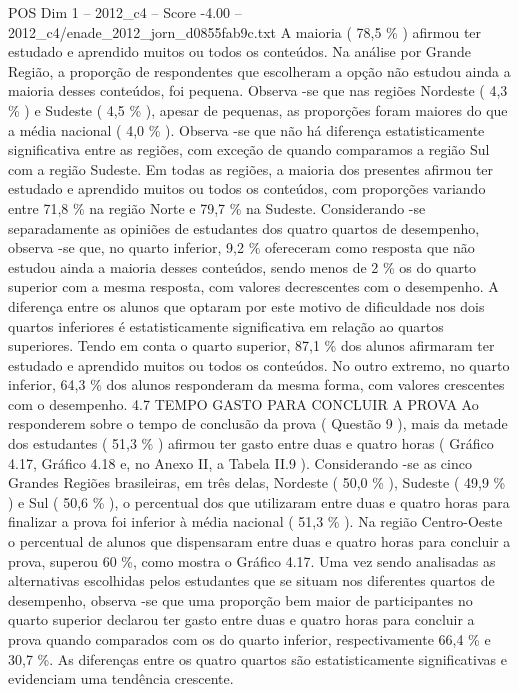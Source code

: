 \begin{textsample}{POS Dim 1 – 2012\_c4 – Score -4.00 – 2012\_c4/enade\_2012\_jorn\_d0855fab9c.txt}
A maioria ( 78,5 \% ) afirmou ter estudado e aprendido muitos ou todos os conteúdos.
Na análise por Grande Região, a proporção de respondentes que escolheram a opção não estudou ainda a maioria desses conteúdos, foi pequena.
Observa -se que nas regiões Nordeste ( 4,3 \% ) e Sudeste ( 4,5 \% ), apesar de pequenas, as proporções foram maiores do que a média nacional ( 4,0 \% ).
Observa -se que não há diferença estatisticamente significativa entre as regiões, com exceção de quando comparamos a região Sul com a região Sudeste.
Em todas as regiões, a maioria dos presentes afirmou ter estudado e aprendido muitos ou todos os conteúdos, com proporções variando entre 71,8 \% na região Norte e 79,7 \% na Sudeste.
Considerando -se separadamente as opiniões de estudantes dos quatro quartos de desempenho, observa -se que, no quarto inferior, 9,2 \% ofereceram como resposta que não estudou ainda a maioria desses conteúdos, sendo menos de 2 \% os do quarto superior com a mesma resposta, com valores decrescentes com o desempenho.
A diferença entre os alunos que optaram por este motivo de dificuldade nos dois quartos inferiores é estatisticamente significativa em relação ao quartos superiores.
Tendo em conta o quarto superior, 87,1 \% dos alunos afirmaram ter estudado e aprendido muitos ou todos os conteúdos.
No outro extremo, no quarto inferior, 64,3 \% dos alunos responderam da mesma forma, com valores crescentes com o desempenho. 4.7 TEMPO GASTO PARA CONCLUIR A PROVA Ao responderem sobre o tempo de conclusão da prova ( Questão 9 ), mais da metade dos estudantes ( 51,3 \% ) afirmou ter gasto entre duas e quatro horas ( Gráfico 4.17, Gráfico 4.18 e, no Anexo II, a Tabela II.9 ).
Considerando -se as cinco Grandes Regiões brasileiras, em três delas, Nordeste ( 50,0 \% ), Sudeste ( 49,9 \% ) e Sul ( 50,6 \% ), o percentual dos que utilizaram entre duas e quatro horas para finalizar a prova foi inferior à média nacional ( 51,3 \% ).
Na região Centro-Oeste o percentual de alunos que dispensaram entre duas e quatro horas para concluir a prova, superou 60 \%, como mostra o Gráfico 4.17.
Uma vez sendo analisadas as alternativas escolhidas pelos estudantes que se situam nos diferentes quartos de desempenho, observa -se que uma proporção bem maior de participantes no quarto superior declarou ter gasto entre duas e quatro horas para concluir a prova quando comparados com os do quarto inferior, respectivamente 66,4 \% e 30,7 \%.
As diferenças entre os quatro quartos são estatisticamente significativas e evidenciam uma tendência crescente.

\end{textsample}
